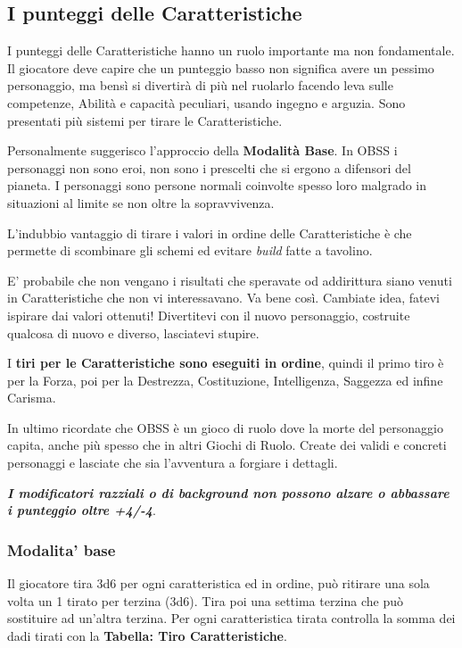 \begin{multicols}{2}
\subsection{I punteggi delle Caratteristiche} \hypertarget{assegnazione.punteggi.caratteristica}{}\label{assegnazionepunteggicaratteristica}

I punteggi delle Caratteristiche hanno un ruolo importante ma non fondamentale. Il giocatore deve capire che un punteggio basso non significa avere un pessimo personaggio, ma bensì si divertirà di più nel ruolarlo facendo leva sulle competenze, Abilità e capacità peculiari, usando ingegno e arguzia. Sono presentati più sistemi per tirare le Caratteristiche.

Personalmente suggerisco l'approccio della \textbf{Modalità Base}. In OBSS i personaggi non sono eroi, non sono i prescelti che si ergono a difensori del pianeta. I personaggi sono persone normali coinvolte spesso loro malgrado in situazioni al limite se non oltre la sopravvivenza.

L'indubbio vantaggio di tirare i valori in ordine delle Caratteristiche è che permette di scombinare gli schemi ed evitare \emph{build} fatte a tavolino.

E' probabile che non vengano i risultati che speravate od addirittura siano venuti in Caratteristiche che non vi interessavano. Va bene così. Cambiate idea, fatevi ispirare dai valori ottenuti! Divertitevi con il nuovo personaggio, costruite qualcosa di nuovo e diverso, lasciatevi stupire.

I \textbf{tiri per le Caratteristiche sono eseguiti in ordine}, quindi il primo tiro è per la Forza, poi per la Destrezza, Costituzione, Intelligenza, Saggezza ed infine Carisma.

In ultimo ricordate che OBSS è un gioco di ruolo dove la morte del personaggio capita, anche più spesso che in altri Giochi di Ruolo. Create dei validi e concreti personaggi e lasciate che sia l'avventura a forgiare i dettagli.

\textbf{\emph{I modificatori razziali o di background non possono alzare o abbassare i punteggio oltre +4/-4}}.

\subsubsection{Modalita' base}\label{modalitabase}

Il giocatore tira 3d6 per ogni caratteristica ed in ordine, può ritirare una sola volta un 1 tirato per terzina (3d6). Tira poi una settima terzina che può sostituire ad un'altra terzina. Per ogni caratteristica tirata controlla la somma dei dadi tirati con la \textbf{Tabella: Tiro Caratteristiche}.


\end{multicols}

